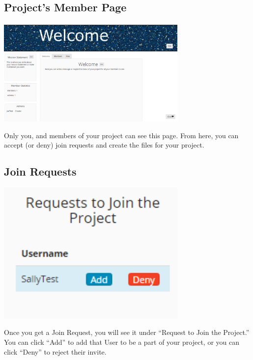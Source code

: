 \documentclass[11pt]{report}
\begin{document}
\subsection{Project's Member Page}
	\begin{center}
           \includegraphics[width=0.7\textwidth]{userguide/memberpage}
    \end{center}
    Only you, and members of your project can see this page. From here, you can accept (or deny) join requests and create the files for your project.

\subsection{Join Requests}
	\begin{center}
           \includegraphics[width=0.7\textwidth]{userguide/joinrequest}
    \end{center}
    Once you get a Join Request, you will see it under “Request to Join the Project.” You can click “Add” to add that User to be a part of your project, or you can click “Deny” to reject their invite.
\end{document}
